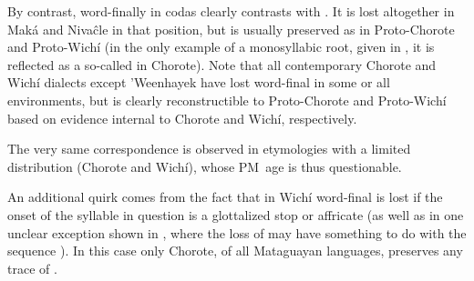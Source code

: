 \begin{exe}
    \ex \coati
\end{exe}

By contrast, word-finally in codas  clearly contrasts with . It is lost altogether in Maká and Nivaĉle in that position, but is usually preserved as  in Proto-Chorote and Proto-Wichí (in the only example of a monosyllabic root, given in , it is reflected as a so-called  in Chorote). Note that all contemporary Chorote and Wichí dialects except ’Weenhayek have lost word-final  in some or all environments, but  is clearly reconstructible to Proto-Chorote and Proto-Wichí based on evidence internal to Chorote and Wichí, respectively.

\begin{exe}
    \ex \companion \label{h-companion}
    \ex \neighbor \label{h-neighbor}
    \ex \spouse \label{h-spouse}
    \ex \snail
    \ex \goimp \label{h-goimp}
    \ex \dog
    \ex \tapeti
    \ex \moon
    \ex \waspaniti
    \ex \doveula
    \ex \lessergrison
\end{exe}

The very same correspondence is observed in etymologies with a limited distribution (Chorote and Wichí), whose PM~age is thus questionable.

\begin{exe}
    \ex \lizard
    \ex \frog
    \ex \fox
\end{exe}

An additional quirk comes from the fact that in Wichí word-final  is lost if the onset of the syllable in question is a glottalized stop or affricate (as well as in one unclear exception shown in , where the loss of  may have something to do with the sequence ). In this case only Chorote, of all Mataguayan languages, preserves any trace of .

\begin{exe}
    \ex \monkparakeet
    \ex \hornero
    \ex \whiteegret
    \ex \rat \label{rat-h-loss}
\end{exe}

